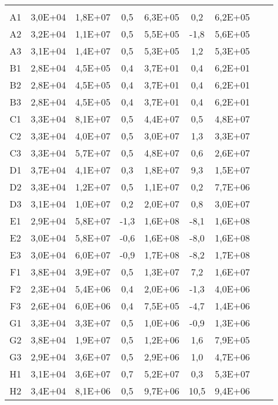 \begin{center}
\begin{longtable}{ccccccccc}
\toprule
\endhead
\midrule \\ %
\endfoot
\bottomrule 
\endlastfoot
A1    & 3,0E+04 & 1,8E+07 & 0,5   & 6,3E+05 & 0,2   & 6,2E+05 \\
A2    & 3,2E+04 & 1,1E+07 & 0,5   & 5,5E+05 & -1,8  & 5,6E+05 \\
A3    & 3,1E+04 & 1,4E+07 & 0,5   & 5,3E+05 & 1,2   & 5,3E+05 \\
B1    & 2,8E+04 & 4,5E+05 & 0,4   & 3,7E+01 & 0,4   & 6,2E+01 \\
B2    & 2,8E+04 & 4,5E+05 & 0,4   & 3,7E+01 & 0,4   & 6,2E+01 \\
B3    & 2,8E+04 & 4,5E+05 & 0,4   & 3,7E+01 & 0,4   & 6,2E+01 \\
C1    & 3,3E+04 & 8,1E+07 & 0,5   & 4,4E+07 & 0,5   & 4,8E+07 \\
C2    & 3,3E+04 & 4,0E+07 & 0,5   & 3,0E+07 & 1,3   & 3,3E+07 \\
C3    & 3,3E+04 & 5,7E+07 & 0,5   & 4,8E+07 & 0,6   & 2,6E+07 \\
D1    & 3,7E+04 & 4,1E+07 & 0,3   & 1,8E+07 & 9,3   & 1,5E+07 \\
D2    & 3,3E+04 & 1,2E+07 & 0,5   & 1,1E+07 & 0,2   & 7,7E+06 \\
D3    & 3,1E+04 & 1,0E+07 & 0,2   & 2,0E+07 & 0,8   & 3,0E+07 \\
E1    & 2,9E+04 & 5,8E+07 & -1,3  & 1,6E+08 & -8,1  & 1,6E+08 \\
E2    & 3,0E+04 & 5,8E+07 & -0,6  & 1,6E+08 & -8,0  & 1,6E+08 \\
E3    & 3,0E+04 & 6,0E+07 & -0,9  & 1,7E+08 & -8,2  & 1,7E+08 \\
F1    & 3,8E+04 & 3,9E+07 & 0,5   & 1,3E+07 & 7,2   & 1,6E+07 \\
F2    & 2,3E+04 & 5,4E+06 & 0,4   & 2,0E+06 & -1,3  & 4,0E+06 \\
F3    & 2,6E+04 & 6,0E+06 & 0,4   & 7,5E+05 & -4,7  & 1,4E+06 \\
G1    & 3,3E+04 & 3,3E+07 & 0,5   & 1,0E+06 & -0,9  & 1,3E+06 \\
G2    & 3,8E+04 & 1,9E+07 & 0,5   & 1,2E+06 & 1,6   & 7,9E+05 \\
G3    & 2,9E+04 & 3,6E+07 & 0,5   & 2,9E+06 & 1,0   & 4,7E+06 \\
H1    & 3,1E+04 & 3,6E+07 & 0,7   & 5,2E+07 & 0,3   & 5,3E+07 \\
H2    & 3,4E+04 & 8,1E+06 & 0,5   & 9,7E+06 & 10,5  & 9,4E+06 \\

\end{longtable}
\end{center}

